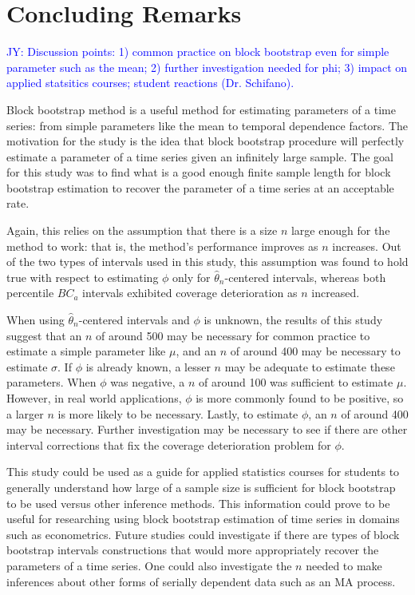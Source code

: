 \documentclass[12pt, letterpaper, titlepage]{article}
\newcommand{\jy}[1]{\textcolor{blue}{JY: #1}}
\begin{document}
\section{Concluding Remarks}
\label{sec:conremarks}

\jy{Discussion points:
  1) common practice on block bootstrap even for simple parameter such as the
  mean;
  2) further investigation needed for phi;
  3) impact on applied statsitics courses; student reactions (Dr. Schifano).
}


Block bootstrap method is a useful method for estimating parameters of a time
series: from simple parameters like the mean to temporal dependence factors.
The motivation for the study is the idea that block bootstrap procedure will
perfectly estimate a parameter of a time series given an infinitely large
sample. The goal for this study was to find what is a good enough finite
sample length for block bootstrap estimation to recover the parameter of a
time series at an acceptable rate.


Again, this relies on the assumption that
there is a size $n$ large enough for the method to work: that is, the method's
performance improves as $n$ increases. Out of the two types of intervals used
in this study, this assumption was found to hold true with respect to
estimating $\phi$ only for $\hat{\theta}_{n}$-centered intervals, whereas both
percentile $BC_a$ intervals exhibited coverage deterioration as $n$
increased.


When using $\hat{\theta}_{n}$-centered intervals and $\phi$ is
unknown, the results of this study suggest that an $n$ of around 500 may be
necessary for common practice to estimate a simple parameter like $\mu$, and
an $n$ of around 400 may be necessary to
estimate $\sigma$. If $\phi$ is already known, a lesser $n$ may be adequate to
estimate these parameters. When $\phi$ was negative, a $n$ of around 100 was
sufficient to estimate $\mu$. However, in real world applications, $\phi$ is
more commonly found to be positive, so a larger $n$ is more likely to be
necessary. Lastly, to estimate $\phi$, an $n$ of around 400 may be necessary.
Further investigation may be necessary to see if there are other interval
corrections that fix the coverage deterioration problem for $\phi$.


This study could be used as a guide for applied statistics courses for students
to generally understand how large of a sample size is sufficient for block
bootstrap to be used versus other inference methods.
This information could prove to be useful for researching using block bootstrap
estimation of time series in domains such as econometrics. Future studies
could investigate if there are types of block bootstrap intervals
constructions that would more appropriately recover the parameters of a time
series. One could also investigate the $n$ needed to make inferences about
other forms of serially dependent data such as an MA process.




\end{document}
